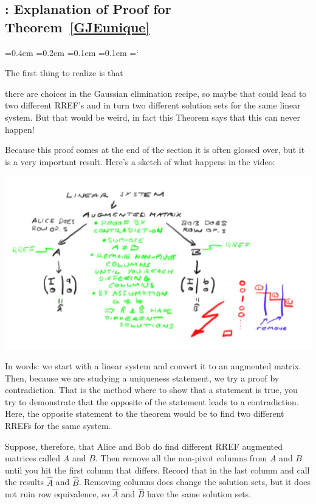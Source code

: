 
\subsection{\elemRowOpsTitle: Explanation of Proof for Theorem~\ref{GJEunique}}

{\ttfamily
{}\font=0.4em
\font=0.2em
\font=0.1em
\font=0.1em
\hyphenchar\font=`\-

\hypertarget{scripts_elementary_row_operations_proof}{The first thing to realize is that} 
there are choices in the Gaussian elimination recipe, so maybe that could lead to two different
RREF's and in turn two different solution sets for the same linear system. But that would be weird,
in fact this Theorem says that this can never happen!

Because this proof comes at the end of the section it is often glossed over, but it is a very important result.
Here's a sketch of what happens in the video:
\begin{center}
\includegraphics[scale=.3]{RREF_unique.jpg}
\end{center}

In words: we start with a linear system and convert it to an augmented matrix. Then, because we are studying a uniqueness
statement, we try a proof by contradiction. That is the  method where to show that a statement is true, you try to demonstrate that
the opposite of the statement leads to a contradiction. Here, the opposite statement to the theorem would be to find
two different RREFs for the same system.

Suppose, therefore, that Alice and Bob do find different RREF augmented matrices called $A$ and $B$. 
Then remove all the non-pivot columns  from $A$ and $B$  until you hit the first column that differs. Record that in the last column
and call the results $\widehat A$ and $\widehat B$. Removing columns
does change the solution sets, but it does not ruin row equivalence, so  $\widehat A$ and $\widehat B$ have the same solution sets.

}
